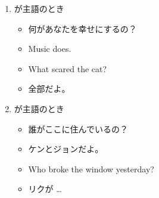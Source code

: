     \begin{enumerate}
        \item {}が主語のとき
        \par\vspace{0.5em}
        \noindent
        \begin{minipage}[t]{0.48\linewidth}
            \begin{itemize}
                \item 何があなたを幸せにするの？
                \item[\answermark] Music does.
            \end{itemize}
        \end{minipage}\hfill
        \begin{minipage}[t]{0.48\linewidth}
            \begin{itemize}
                \item What scared the cat?
                \item[\answermark] 全部だよ。
            \end{itemize}
        \end{minipage}
        \par\vspace{2em}
        \item {}が主語のとき
        \par\vspace{0.5em}
        \noindent
        \begin{minipage}[t]{0.48\linewidth}
            \begin{itemize}
                \item 誰がここに住んでいるの？
                \item[\answermark] ケンとジョンだよ。
            \end{itemize}
        \end{minipage}\hfill
        \begin{minipage}[t]{0.48\linewidth}
            \begin{itemize}
                \item Who broke the window yesterday?
                \item[\answermark] リクが \dots
            \end{itemize}
        \end{minipage}
        \par\vspace{0.5em}
    \end{enumerate}
\vspace{2em}

